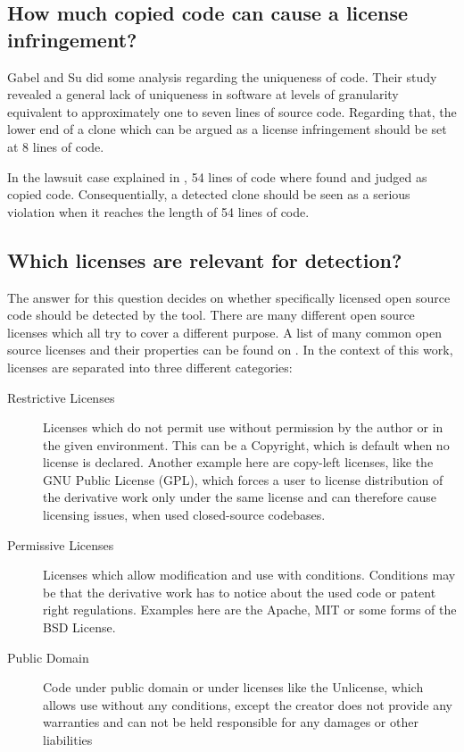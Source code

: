 \subsection*{How much copied code can cause a license infringement?}
Gabel and Su did some analysis regarding the uniqueness of code.
Their study \glqq revealed a general lack of uniqueness in software at levels of granularity equivalent to approximately one to seven lines of source code\grqq \cite{2010-gabel-su-source-code-uniqueness}.
Regarding that, the lower end of a clone which can be argued as a license infringement should be set at 8 lines of code.

In the lawsuit case explained in \cite{mertzel2008copying}, 54 lines of code where found and judged as copied code.
Consequentially, a detected clone should be seen as a serious violation when it reaches the length of 54 lines of code.

\subsection*{Which licenses are relevant for detection?}
The answer for this question decides on whether specifically licensed open source code should be detected by the tool.
There are many different open source licenses which all try to cover a different purpose.
A list of many common open source licenses and their properties can be found on \cite{licenses}.
In the context of this work, licenses are separated into three different categories:

\begin{description}
	\item[Restrictive Licenses] Licenses which do not permit use without permission by the author or in the given environment.
		This can be a Copyright, which is default when no license is declared.
		Another example here are copy-left licenses, like the GNU Public License (GPL), which forces a user to license distribution of the derivative work only under the same license and can therefore cause licensing issues, when used closed-source codebases.
	\item[Permissive Licenses]
		Licenses which allow modification and use with conditions.
		Conditions may be that the derivative work has to notice about the used code or patent right regulations.
		Examples here are the Apache, MIT or some forms of the BSD License.
	\item[Public Domain] 
		Code under public domain or under licenses like the Unlicense, which allows use without any conditions, except the creator does not provide any warranties and can not be held responsible for any damages or other liabilities
\end{description}

